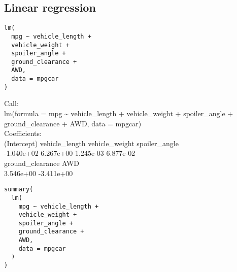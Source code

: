 \documentclass[11pt]{article}
\begin{document}
\subsection{Linear regression}
\label{sec:orgd80262c}

\begin{verbatim}
lm(
  mpg ~ vehicle_length +
  vehicle_weight +
  spoiler_angle +
  ground_clearance +
  AWD,
  data = mpgcar
)
\end{verbatim}

\begin{org}


Call:\\
lm(formula = mpg \textasciitilde{} vehicle\_length + vehicle\_weight + spoiler\_angle +\\
    ground\_clearance + AWD, data = mpgcar)\\

Coefficients:\\
     (Intercept)    vehicle\_length    vehicle\_weight     spoiler\_angle\\
      -1.040e+02         6.267e+00         1.245e-03         6.877e-02\\
ground\_clearance               AWD\\
       3.546e+00        -3.411e+00\\
\end{org}

\begin{verbatim}
summary(
  lm(
    mpg ~ vehicle_length +
    vehicle_weight +
    spoiler_angle +
    ground_clearance +
    AWD,
    data = mpgcar
  )
)
\end{verbatim}
\end{document}
